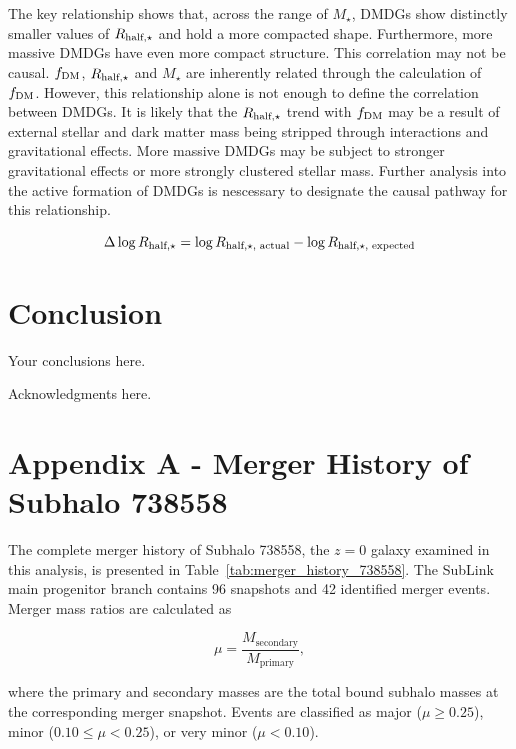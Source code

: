 \documentclass[twocolumn]{openjournal}
\begin{document}
The key relationship shows that, across the range of $M_\star$, DMDGs show distinctly smaller values of $R_{\textup{half}, \star}$ and hold a more compacted shape. Furthermore, more massive DMDGs have even more compact structure. This correlation may not be causal. $f_\textup{DM}$, $R_{\textup{half}, \star}$ and $M_\star$ are inherently related through the calculation of $f_\textup{DM}$. However, this relationship alone is not enough to define the correlation between DMDGs. It is likely that the $R_{\textup{half}, \star}$ trend with $f_\textup{DM}$ may be a result of external stellar and dark matter mass being stripped through interactions and gravitational effects. More massive DMDGs may be subject to stronger gravitational effects or more strongly clustered stellar mass. Further analysis into the active formation of DMDGs is nescessary to designate the causal pathway for this relationship.

\begin{equation}
\label{residual calculation}
\Delta \log R_{\textup{half,} \star} = \log R_{\textup{half,} \star \textup{, actual}} - \log R_{\textup{half,} \star \textup{, expected}}
\end{equation}

\section{Conclusion}

Your conclusions here.
\acknowledgments

Acknowledgments here.


\printbibliography
\appendix
\section{Appendix A - Merger History of Subhalo 738558} \label{app: Merger History}

The complete merger history of Subhalo 738558, the $z=0$ galaxy examined in
this analysis, is presented in Table~\ref{tab:merger_history_738558}.
The SubLink main progenitor branch contains 96 snapshots and 42 identified
merger events. Merger mass ratios are calculated as

\[
\mu = \frac{M_{\mathrm{secondary}}}{M_{\mathrm{primary}}},
\]

where the primary and secondary masses are the total bound subhalo masses
at the corresponding merger snapshot. Events are classified as major
($\mu \geq 0.25$), minor ($0.10 \leq \mu < 0.25$), or very minor
($\mu < 0.10$).
\end{document}

